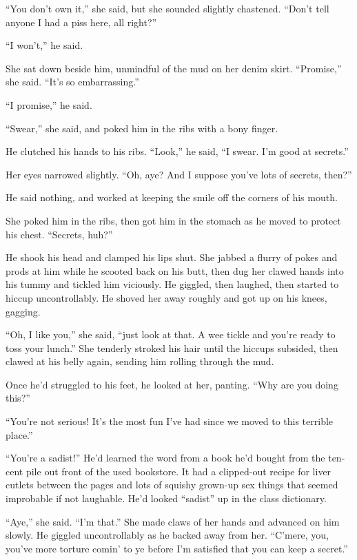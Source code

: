 ``You don't own it,'' she said, but she sounded slightly chastened. 
``Don't tell anyone I had a piss here, all right?''

``I won't,'' he said.

She sat down beside him, unmindful of the mud on her denim skirt. 
``Promise,'' she said.  ``It's so embarrassing.''

``I promise,'' he said.

``Swear,'' she said, and poked him in the ribs with a bony finger.

He clutched his hands to his ribs.  ``Look,'' he said, ``I swear.  I'm
good at secrets.''

Her eyes narrowed slightly.  ``Oh, aye?  And I suppose you've lots of
secrets, then?''

He said nothing, and worked at keeping the smile off the corners of
his mouth.

She poked him in the ribs, then got him in the stomach as he moved to
protect his chest.  ``Secrets, huh?''

He shook his head and clamped his lips shut.  She jabbed a flurry of
pokes and prods at him while he scooted back on his butt, then dug her
clawed hands into his tummy and tickled him viciously.  He giggled,
then laughed, then started to hiccup uncontrollably.  He shoved her
away roughly and got up on his knees, gagging.

``Oh, I like you,'' she said, ``just look at that.  A wee tickle and
you're ready to toss your lunch.'' She tenderly stroked his hair until
the hiccups subsided, then clawed at his belly again, sending him
rolling through the mud.

Once he'd struggled to his feet, he looked at her, panting.  ``Why are
you doing this?''

``You're not serious!  It's the most fun I've had since we moved to
this terrible place.''

``You're a sadist!'' He'd learned the word from a book he'd bought
from the ten-cent pile out front of the used bookstore.  It had a
clipped-out recipe for liver cutlets between the pages and lots of
squishy grown-up sex things that seemed improbable if not laughable. 
He'd looked ``sadist'' up in the class dictionary.

``Aye,'' she said.  ``I'm that.'' She made claws of her hands and
advanced on him slowly.  He giggled uncontrollably as he backed away
from her.  ``C'mere, you, you've more torture comin' to ye before I'm
satisfied that you can keep a secret.''

